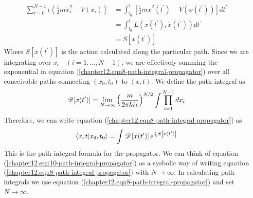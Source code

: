 \begin{enumerate}
	\begin{align}
		\sum_{i=0}^{N-1} \epsilon \left(\frac{1}{2} m \dot{x}_i^2 - V(x_i)\right) 
		&= \int_{t_0}^{t} \left[\frac{1}{2} m \dot{x}^2(t^\prime) - V(x(t^\prime))\right] dt^\prime \\
		&= \int_{t_0}^{t} L\left(x(t^\prime), \dot{x}(t^\prime)\right) dt^\prime \\
		&= S[x(t^\prime)]
	\end{align}
	Where $S\left[x(t^\prime)\right]$ is the action calculated along the particular path. Since we are integrating over $x_i\quad (i=1,\ldots,N-1)$, we are effectively summing the exponential in equation (\ref{chapter12.eqn8-path-integral-propagator}) over all conceivable paths connecting $(x_0, t_0)$ to $(x, t)$. We define the path integral as
	\begin{equation}
		\mathcal{D}[x(t^\prime)] = \lim\limits_{N\rightarrow \infty} \left(\frac{m}{2 \pi \hbar {i\mkern1mu} \epsilon}\right)^{N/2} \int \prod_{i=1}^{N-1} dx_i 
		\label{chapter12.eqn9-path-integral-propagator}
	\end{equation}
	Therefore, we can write equation (\ref{chapter12.eqn8-path-integral-propagator}) as
	\begin{equation}
		\braket{x, t}{x_0, t_0} = \int \mathcal{D}\left[x(t^\prime)\right] e^{\frac{i}{\hbar} S\left[x(t^\prime)\right]}
		\label{chapter12.eqn10-path-integral-propagator}
	\end{equation}
	This is the path integral formula for the propagator. We can think of equation (\ref{chapter12.eqn10-path-integral-propagator}) as a sysbolic way of writing equation (\ref{chapter12.eqn8-path-integral-propagator}) with $N \rightarrow \infty$. In calculating path integrals we use equation (\ref{chapter12.eqn8-path-integral-propagator}) and set $N \rightarrow \infty$.
	

\end{enumerate}
